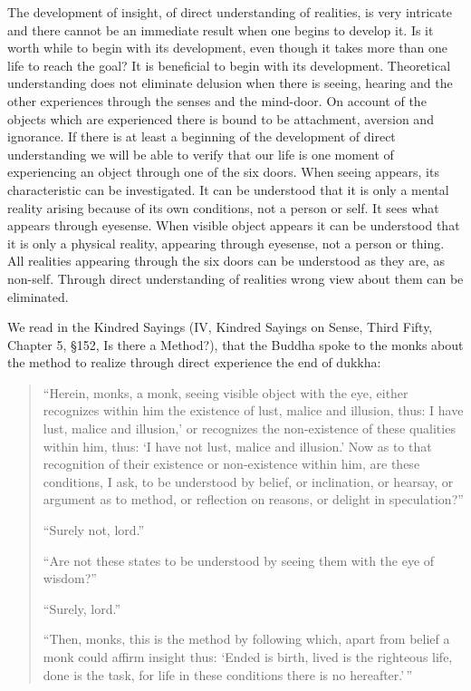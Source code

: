 \documentclass{book}
\begin{document}
The development of insight, of direct understanding of realities, is
very intricate and there cannot be an imme­diate result when one begins
to develop it. Is it worth while to begin with its development, even
though it takes more than one life to reach the goal? It is beneficial
to begin with its development. Theoretical understanding does not
eliminate delusion when there is seeing, hearing and the other
experiences through the senses and the mind-door. On account of the
objects which are experienced there is bound to be attachment, aversion
and ignorance. If there is at least a beginning of the development of
direct understanding we will be able to verify that our life is one
moment of experiencing an object through one of the six doors. When
seeing appears, its characteristic can be invest­igated. It can be
understood that it is only a mental reality arising because of its own
conditions, not a person or self. It sees what appears through
eyesense. When visible object appears it can be understood that it is
only a physical reality, appearing through eyesense, not a person or
thing. All realities appearing through the six doors can be understood
as they are, as non-self. Through direct understanding of realities
wrong view about them can be eliminated.

We read in the Kindred Sayings (IV, Kindred Sayings on Sense, Third
Fifty, Chapter 5, §152, Is there a Method?), that the Buddha spoke to
the monks about the method to realize through direct experience the end
of dukkha:

\begin{quote}
``Herein, monks, a monk, seeing visible object with the eye, either
recognizes within him the existence of lust, malice and illusion, thus:
I have lust, malice and illusion,' or recognizes the non-existence of
these qualities within him, thus: `I have not lust, malice and
illusion.' Now as to that recognition of their existence or
non-existence within him, are these conditions, I ask, to be understood
by belief, or inclination, or hearsay, or argument as to method, or
reflection on reasons, or delight in speculation?''

``Surely not, lord.''

``Are not these states to be understood by seeing them with the eye of
wisdom?''

``Surely, lord.''

``Then, monks, this is the method by following which, apart from belief
a monk could affirm insight thus: `Ended is birth, lived is the
righteous life, done is the task, for life in these conditions there is
no hereafter.'\,''
\end{quote}
\end{document}
